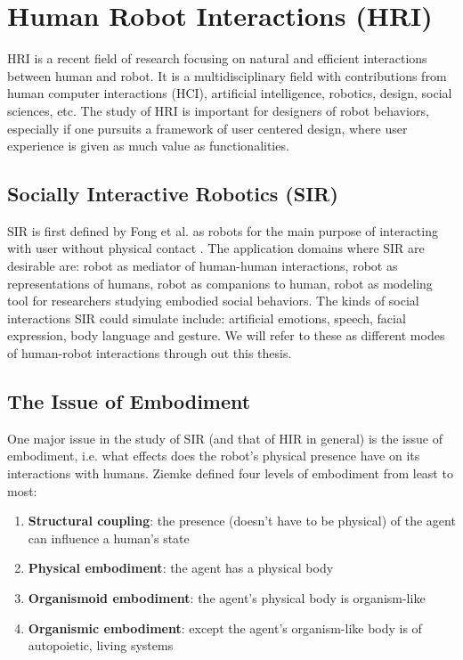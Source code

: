 \section{Human Robot Interactions (HRI)}

HRI is a recent field of research focusing on natural and efficient interactions between human and robot.  It is a multidisciplinary field with contributions from human computer interactions (HCI), artificial intelligence, robotics, design, social sciences, etc.  The study of HRI is important for designers of robot behaviors, especially if one pursuits a framework of user centered design, where user experience is given as much value as functionalities. 


\subsection{Socially Interactive Robotics (SIR)}
SIR is first defined by Fong et al. as robots for the main purpose of interacting with user without physical contact \cite{fong2003survey}.  The application domains where SIR are desirable are: robot as mediator of human-human interactions, robot as representations of humans, robot as companions to human, robot as modeling tool for researchers studying embodied social behaviors.  The kinds of social interactions SIR could simulate include: artificial emotions, speech, facial expression, body language and gesture.  We will refer to these as different modes of human-robot interactions through out this thesis.


\subsection{The Issue of Embodiment}
One major issue in the study of SIR (and that of HIR in general) is the issue of embodiment, i.e. what effects does the robot's physical presence have on its interactions with humans.  Ziemke \cite{ziemke2001disentangling} defined four levels of embodiment from least to most:
\begin{enumerate}
	\item \textbf{Structural coupling}: the presence (doesn't have to be physical) of the agent can influence a human's state
	\item \textbf{Physical embodiment}: the agent has a physical body
	\item \textbf{Organismoid embodiment}: the agent's physical body is organism-like
	\item \textbf{Organismic embodiment}: except the agent's organism-like body is of autopoietic, living systems
\end{enumerate}


